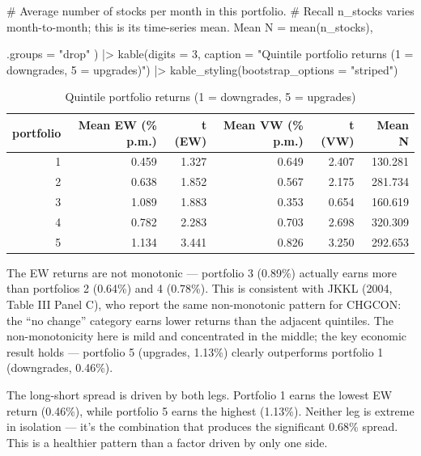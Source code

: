 \documentclass[
  letterpaper,
  DIV=11,
  numbers=noendperiod]{scrartcl}
\newenvironment{Shaded}{\begin{snugshade}}{\end{snugshade}}
\newcommand{\AttributeTok}[1]{\textcolor[rgb]{0.40,0.45,0.13}{#1}}
\newcommand{\CommentTok}[1]{\textcolor[rgb]{0.37,0.37,0.37}{#1}}
\newcommand{\DecValTok}[1]{\textcolor[rgb]{0.68,0.00,0.00}{#1}}
\newcommand{\FunctionTok}[1]{\textcolor[rgb]{0.28,0.35,0.67}{#1}}
\newcommand{\NormalTok}[1]{\textcolor[rgb]{0.00,0.23,0.31}{#1}}
\newcommand{\OtherTok}[1]{\textcolor[rgb]{0.00,0.23,0.31}{#1}}
\newcommand{\SpecialCharTok}[1]{\textcolor[rgb]{0.37,0.37,0.37}{#1}}
\newcommand{\StringTok}[1]{\textcolor[rgb]{0.13,0.47,0.30}{#1}}
\begin{document}
\begin{Shaded}
\begin{Highlighting}[]
    \CommentTok{\# Average number of stocks per month in this portfolio.}
    \CommentTok{\# Recall n\_stocks varies month{-}to{-}month; this is its time{-}series mean.}
    \StringTok{\textasciigrave{}}\AttributeTok{Mean N}\StringTok{\textasciigrave{}} \OtherTok{=} \FunctionTok{mean}\NormalTok{(n\_stocks),}
    
    \AttributeTok{.groups =} \StringTok{"drop"}
\NormalTok{  ) }\SpecialCharTok{|\textgreater{}}
  \FunctionTok{kable}\NormalTok{(}\AttributeTok{digits =} \DecValTok{3}\NormalTok{,}
        \AttributeTok{caption =} \StringTok{"Quintile portfolio returns (1 = downgrades, 5 = upgrades)"}\NormalTok{) }\SpecialCharTok{|\textgreater{}}
  \FunctionTok{kable\_styling}\NormalTok{(}\AttributeTok{bootstrap\_options =} \StringTok{"striped"}\NormalTok{)}
\end{Highlighting}
\end{Shaded}

\begin{longtable}[t]{rrrrrr}
\caption{\label{tab:monotonicity-table}Quintile portfolio returns (1 = downgrades, 5 = upgrades)}\\
\toprule
portfolio & Mean EW (\% p.m.) & t (EW) & Mean VW (\% p.m.) & t (VW) & Mean N\\
\midrule
1 & 0.459 & 1.327 & 0.649 & 2.407 & 130.281\\
2 & 0.638 & 1.852 & 0.567 & 2.175 & 281.734\\
3 & 1.089 & 1.883 & 0.353 & 0.654 & 160.619\\
4 & 0.782 & 2.283 & 0.703 & 2.698 & 320.309\\
5 & 1.134 & 3.441 & 0.826 & 3.250 & 292.653\\
\bottomrule
\end{longtable}

The EW returns are not monotonic --- portfolio 3 (0.89\%) actually earns
more than portfolios 2 (0.64\%) and 4 (0.78\%). This is consistent with
JKKL (2004, Table III Panel C), who report the same non-monotonic
pattern for CHGCON: the ``no change'' category earns lower returns than
the adjacent quintiles. The non-monotonicity here is mild and
concentrated in the middle; the key economic result holds --- portfolio
5 (upgrades, 1.13\%) clearly outperforms portfolio 1 (downgrades,
0.46\%).

The long-short spread is driven by both legs. Portfolio 1 earns the
lowest EW return (0.46\%), while portfolio 5 earns the highest (1.13\%).
Neither leg is extreme in isolation --- it's the combination that
produces the significant 0.68\% spread. This is a healthier pattern than
a factor driven by only one side.
\end{document}
